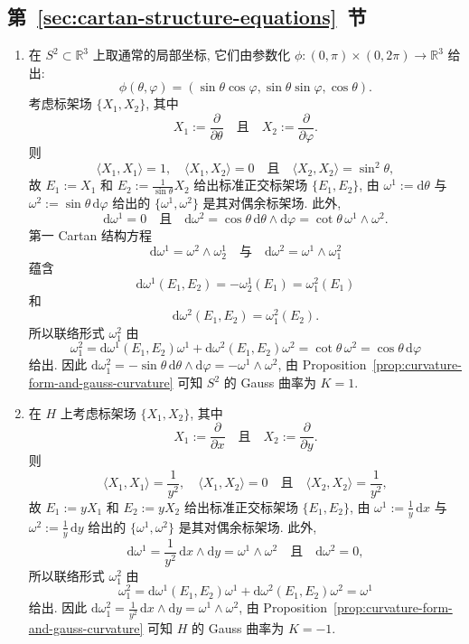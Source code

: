 \subsection{\texorpdfstring{第~\ref{sec:cartan-structure-equations}~节}{Cartan 结构方程}}\label{subsec:solutions-cartan-structure-equations}

\begin{description}[font=\normalfont,leftmargin=2em,labelwidth=1.5em]
\begin{enumerate}[label=(\alph*),ref=\alph*,leftmargin=*]
\item 在 $S^2\subset\mathbb{R}^3$ 上取通常的局部坐标, 它们由参数化 $\phi:(0,\pi)\times(0,2\pi)\to\mathbb{R}^3$ 给出:
\[
  \phi(\theta,\varphi)=(\sin\theta\cos\varphi,\sin\theta\sin\varphi,\cos\theta).
\]
考虑标架场 $\{X_1,X_2\}$, 其中
\[
  X_1:=\frac{\partial}{\partial\theta}\quad\text{且}\quad X_2:=\frac{\partial}{\partial\varphi}.
\]
则
\[
  \langle X_1,X_1\rangle=1,\quad \langle X_1,X_2\rangle=0
  \quad\text{且}\quad \langle X_2,X_2\rangle=\sin^2\theta,
\]
故 $E_1:=X_1$ 和 $E_2:=\frac1{\sin\theta}X_2$ 给出标准正交标架场 $\{E_1,E_2\}$, 由 $\omega^1:=\mathrm{d}\theta$ 与 $\omega^2:=\sin\theta\,\mathrm{d}\varphi$ 给出的 $\{\omega^1,\omega^2\}$ 是其对偶余标架场. 此外,
\[
  \mathrm{d}\omega^1=0\quad\text{且}\quad
  \mathrm{d}\omega^2=\cos\theta\,\mathrm{d}\theta\wedge\mathrm{d}\varphi
      =\cot\theta\,\omega^1\wedge\omega^2.
\]
第一 Cartan 结构方程
\[
  \mathrm{d}\omega^1=\omega^2\wedge\omega_2^1
   \quad\text{与}\quad \mathrm{d}\omega^2=\omega^1\wedge\omega_1^2
\]
蕴含
\[
  \mathrm{d}\omega^1(E_1,E_2)=-\omega_2^1(E_1)=\omega_1^2(E_1)
\]
和
\[
  \mathrm{d}\omega^2(E_1,E_2)=\omega_1^2(E_2).
\]
所以联络形式 $\omega_1^2$ 由
\[
  \omega_1^2=\mathrm{d}\omega^1(E_1,E_2)\omega^1+\mathrm{d}\omega^2(E_1,E_2)\omega^2
    =\cot\theta\,\omega^2=\cos\theta\,\mathrm{d}\varphi
\]
给出. 因此 $\mathrm{d}\omega_1^2=-\sin\theta\,\mathrm{d}\theta\wedge\mathrm{d}\varphi=-\omega^1\wedge\omega^2$, 由 Proposition~\ref{prop:curvature-form-and-gauss-curvature} 可知 $S^2$ 的 Gauss 曲率为 $K=1$.
\item 在 $H$ 上考虑标架场 $\{X_1,X_2\}$, 其中
\[
  X_1:=\frac{\partial}{\partial x}\quad\text{且}\quad X_2:=\frac{\partial}{\partial y}.
\]
则
\[
  \langle X_1,X_1\rangle=\frac1{y^2},\quad \langle X_1,X_2\rangle=0
  \quad\text{且}\quad \langle X_2,X_2\rangle=\frac1{y^2},
\]
故 $E_1:=yX_1$ 和 $E_2:=yX_2$ 给出标准正交标架场 $\{E_1,E_2\}$, 由 $\omega^1:=\frac1y\,\mathrm{d}x$ 与 $\omega^2:=\frac1y\,\mathrm{d}y$ 给出的 $\{\omega^1,\omega^2\}$ 是其对偶余标架场. 此外,
\[
  \mathrm{d}\omega^1=\frac1{y^2}\,\mathrm{d}x\wedge\mathrm{d}y=\omega^1\wedge\omega^2
  \quad\text{且}\quad \mathrm{d}\omega^2=0,
\]
所以联络形式 $\omega_1^2$ 由
\[
  \omega_1^2=\mathrm{d}\omega^1(E_1,E_2)\omega^1+\mathrm{d}\omega^2(E_1,E_2)\omega^2=\omega^1
\]
给出. 因此 $\mathrm{d}\omega_1^2=\frac1{y^2}\,\mathrm{d}x\wedge\mathrm{d}y=\omega^1\wedge\omega^2$, 由 Proposition~\ref{prop:curvature-form-and-gauss-curvature} 可知 $H$ 的 Gauss 曲率为 $K=-1$.
\end{enumerate}


\end{description}
